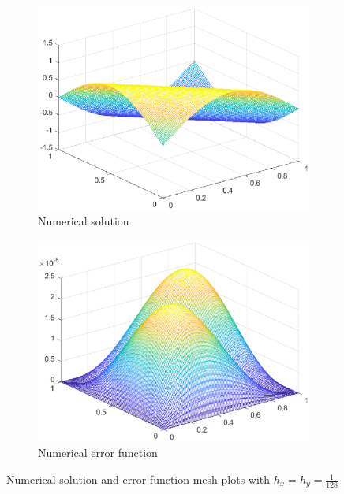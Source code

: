 \documentclass{homework}
\begin{document}
\begin{alphaparts}
		\begin{figure}[h]
			\begin{subfigure}{.45\textwidth}
				\centering
				\includegraphics[width=\textwidth]{p1c_u.eps}
				\caption{Numerical solution}
			\end{subfigure}
			\hfill
			\begin{subfigure}{.45\textwidth}
				\centering
				\includegraphics[width=\textwidth]{p1c_error.eps}
				\caption{Numerical error function}
			\end{subfigure}
			\caption{Numerical solution and error function mesh plots with $h_x = h_y=\frac{1}{128}$}
			\label{fig:p1c}
		\end{figure}
		

\end{alphaparts}
\end{document}
